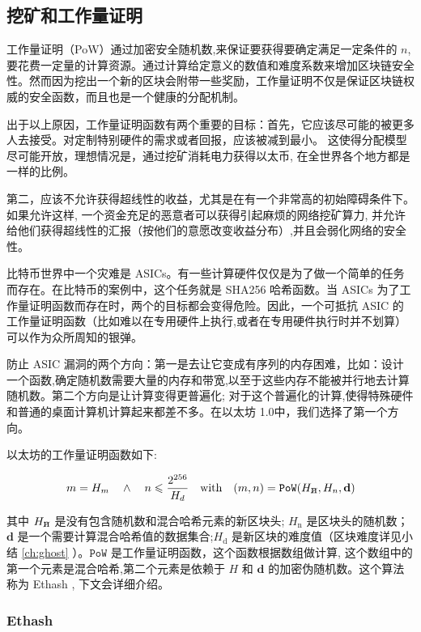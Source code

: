 \documentclass[9pt,oneside]{amsart}
\newcommand{\hcancel}[1]{%
    \tikz[baseline=(tocancel.base)]{
        \node[inner sep=0pt,outer sep=0pt] (tocancel) {#1};
        \draw[black] (tocancel.south west) -- (tocancel.north east);
    }%
}%
\begin{document}
\begin{multicols}{2}
\subsection{挖矿和工作量证明} \label{ch:pow}

工作量证明（PoW）通过加密安全随机数,来保证要获得要确定满足一定条件的 $n$,要花费一定量的计算资源。通过计算给定意义的数值和难度系数来增加区块链安全性。然而因为挖出一个新的区块会附带一些奖励，工作量证明不仅是保证区块链权威的安全函数，而且也是一个健康的分配机制。

出于以上原因，工作量证明函数有两个重要的目标：首先，它应该尽可能的被更多人去接受。对定制特别硬件的需求或者回报，应该被减到最小。 这使得分配模型尽可能开放，理想情况是，通过挖矿消耗电力获得以太币, 在全世界各个地方都是一样的比例。

第二，应该不允许获得超线性的收益，尤其是在有一个非常高的初始障碍条件下。如果允许这样, 一个资金充足的恶意者可以获得引起麻烦的网络挖矿算力, 并允许给他们获得超线性的汇报（按他们的意愿改变收益分布）,并且会弱化网络的安全性。

比特币世界中一个灾难是 ASICs。有一些计算硬件仅仅是为了做一个简单的任务而存在。在比特币的案例中，这个任务就是 SHA256 哈希函数。当 ASICs 为了工作量证明函数而存在时，两个的目标都会变得危险。因此，一个可抵抗 ASIC 的工作量证明函数（比如难以在专用硬件上执行,或者在专用硬件执行时并不划算）可以作为众所周知的银弹。

防止 ASIC 漏洞的两个方向：第一是去让它变成有序列的内存困难，比如：设计一个函数,确定随机数需要大量的内存和带宽,以至于这些内存不能被并行地去计算随机数。第二个方向是让计算变得更普遍化; 对于这个普遍化的计算,使得特殊硬件和普通的桌面计算机计算起来都差不多。在以太坊 1.0中，我们选择了第一个方向。

以太坊的工作量证明函数如下:

\begin{equation}
m = H_m \quad \wedge \quad n \leqslant \frac{2^{256}}{H_d} \quad \text{with} \quad (m, n) = \mathtt{PoW}(H_{\hcancel{n}}, H_n, \mathbf{d})
\end{equation}

其中 $H_{\hcancel{n}}$ 是没有包含随机数和混合哈希元素的新区块头; $H_{\mathrm{n}}$ 是区块头的随机数；$\mathbf{d}$ 是一个需要计算混合哈希值的数据集合;$H_{\mathrm{d}}$ 是新区块的难度值（区块难度详见小结 \ref{ch:ghost} ）。$\mathtt{PoW}$ 是工作量证明函数，这个函数根据数组做计算, 这个数组中的第一个元素是混合哈希,第二个元素是依赖于 $H$ 和 $\mathbf{d}$ 的加密伪随机数。这个算法称为 Ethash , 下文会详细介绍。

\subsubsection{Ethash}


\end{multicols}
\end{document}
